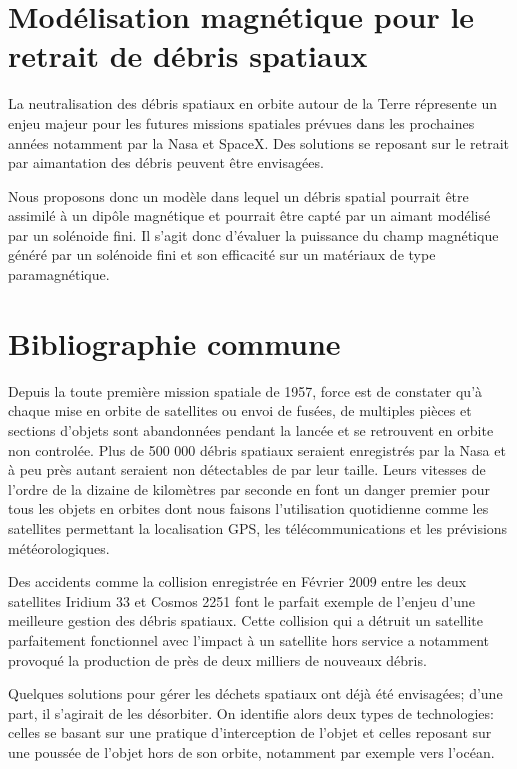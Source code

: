 \documentclass[a4paper,1pt]{article}
\begin{document}
\section{Modélisation magnétique pour le retrait de débris spatiaux}

La neutralisation des débris spatiaux en orbite autour de la Terre répresente un enjeu majeur pour les futures missions spatiales prévues dans les prochaines années notamment par la Nasa et SpaceX. Des solutions se reposant sur le retrait par aimantation des débris peuvent être envisagées.

Nous proposons donc un modèle dans lequel un débris spatial pourrait être assimilé à un dipôle magnétique et pourrait être capté par un aimant modélisé par un solénoide fini. Il s'agit donc d'évaluer la puissance du champ magnétique généré par un solénoide fini et son efficacité sur un matériaux de type paramagnétique. 
\section{Bibliographie commune}
Depuis la toute première mission spatiale de 1957, force est de constater qu'à chaque mise en orbite de satellites ou envoi de fusées, de multiples pièces et sections d'objets sont abandonnées pendant la lancée et se retrouvent en orbite non controlée. Plus de 500 000 débris spatiaux seraient enregistrés par la Nasa et à peu près autant seraient non détectables de par leur taille. Leurs vitesses de l'ordre de la dizaine de kilomètres par seconde en font un danger premier pour tous les objets en orbites dont nous faisons l'utilisation quotidienne comme les satellites permettant la localisation GPS, les télécommunications et les prévisions météorologiques. \cite{Kurz1}

Des accidents comme la collision enregistrée en Février 2009 entre les deux satellites Iridium 33 et Cosmos 2251 \cite{CollExemple} font le parfait exemple de l'enjeu d'une meilleure gestion des débris spatiaux. Cette collision qui a détruit un satellite parfaitement fonctionnel avec l'impact à un satellite hors service a notamment provoqué la production de près de deux milliers de nouveaux débris. 

Quelques solutions \cite{SolExemples} pour gérer les déchets spatiaux ont déjà été envisagées; d'une part, il s'agirait de les désorbiter. On identifie alors deux types de technologies: celles se basant sur une pratique d'interception de l'objet et celles reposant sur une poussée de l'objet hors de son orbite, notamment par exemple vers l'océan. 
\end{document}
